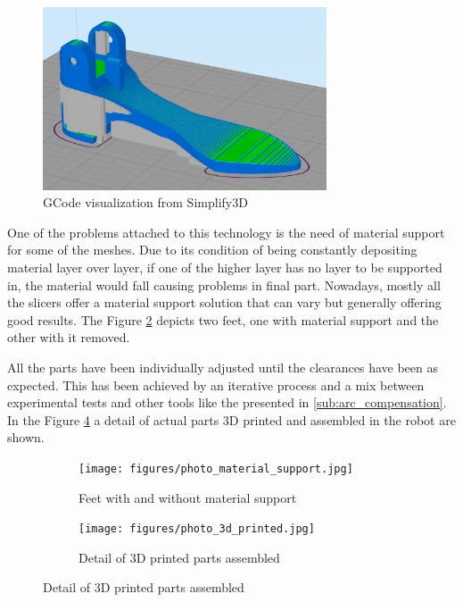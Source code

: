 \begin{figure}[htb]
  \centering
  \includegraphics[width=0.75\textwidth]{figures/3d_printing_gcode}
  \caption{GCode visualization from Simplify3D \cite{simplify3d}}
  \label{fig:3d_printing_gcode}
\end{figure}

One of the problems attached to this technology is the need of material support for some of the meshes.
Due to its condition of being constantly depositing material layer over layer, if one of the higher layer has no layer to be supported in, the material would fall causing problems in final part.
Nowadays, mostly all the slicers offer a material support solution that can vary but generally offering good results.
The Figure \ref{fig:photo_material_support} depicts two feet, one with material support and the other with it removed.

All the parts have been individually adjusted until the clearances have been as expected.
This has been achieved by an iterative process and a mix between experimental tests and other tools like the presented in \ref{sub:arc_compensation}.
In the Figure \ref{fig:photo_3d_printed} a detail of actual parts 3D printed and assembled in the robot are shown.

\begin{figure}[ht]
    \centering
    \begin{subfigure}[b]{0.49\textwidth}
        \texttt{[image: figures/photo\_material\_support.jpg]}
        \caption{Feet with and without material support}
        \label{fig:photo_material_support}
    \end{subfigure}
    \begin{subfigure}[b]{0.49\textwidth}
        \texttt{[image: figures/photo\_3d\_printed.jpg]}
        \caption{Detail of 3D printed parts assembled}
        \label{fig:photo_3d_printed}
    \end{subfigure}
\end{figure}

